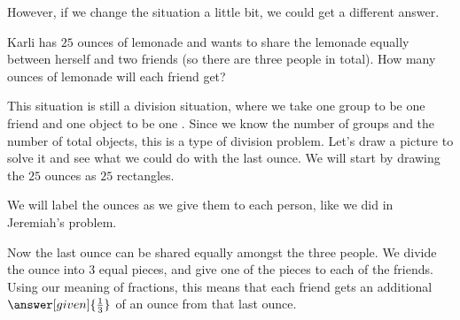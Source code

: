 \documentclass{ximera}
\begin{document}
However, if we change the situation a little bit, we could get a different answer.

\begin{question}
Karli has $25$ ounces of lemonade and wants to share the lemonade equally between herself and two friends (so there are three people in total). How many ounces of lemonade will each friend get?

\begin{explanation}
This situation is still a division situation, where we take one group to be one friend and one object to be one . Since we know the number of groups and the number of total objects, this is a  type of division problem. Let's draw a picture to solve it and see what we could do with the last ounce. We will start by drawing the $25$ ounces as $25$ rectangles.
\begin{image}  \end{image}


We will label the ounces as we give them to each person, like we did in Jeremiah's problem.
\begin{image}  \end{image}
Now the last ounce can be shared equally amongst the three people. We divide the ounce into $3$ equal pieces, and give one of the pieces to each of the friends. Using our meaning of fractions, this means that each friend gets an additional $\answer[given]{\frac{1}{3}}$ of an ounce from that last ounce.




\end{explanation}
\end{question}
\end{document}
